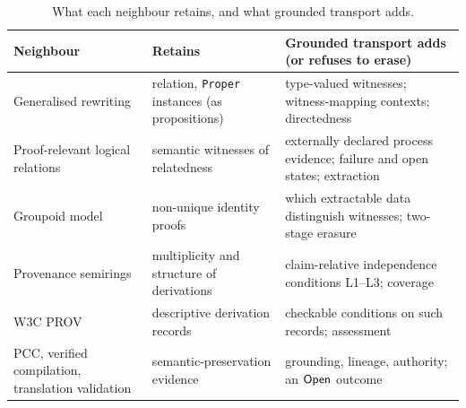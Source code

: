 \begin{table}[t]
\centering\small
\caption{What each neighbour retains, and what grounded transport adds.}\label{tab:related}
\begin{tabularx}{\textwidth}{@{}lYY@{}}
\toprule
Neighbour & Retains & Grounded transport adds (or refuses to erase) \\
\midrule
Generalised rewriting & relation, \texttt{Proper} instances (as propositions) & type-valued witnesses; witness-mapping contexts; directedness \\
Proof-relevant logical relations & semantic witnesses of relatedness & externally declared process evidence; failure and open states; extraction \\
Groupoid model & non-unique identity proofs & which extractable data distinguish witnesses; two-stage erasure \\
Provenance semirings & multiplicity and structure of derivations & claim-relative independence conditions L1--L3; coverage \\
W3C PROV & descriptive derivation records & checkable conditions on such records; assessment \\
PCC, verified compilation, translation validation & semantic-preservation evidence & grounding, lineage, authority; an $\mathsf{Open}$ outcome \\
\bottomrule
\end{tabularx}
\end{table}
